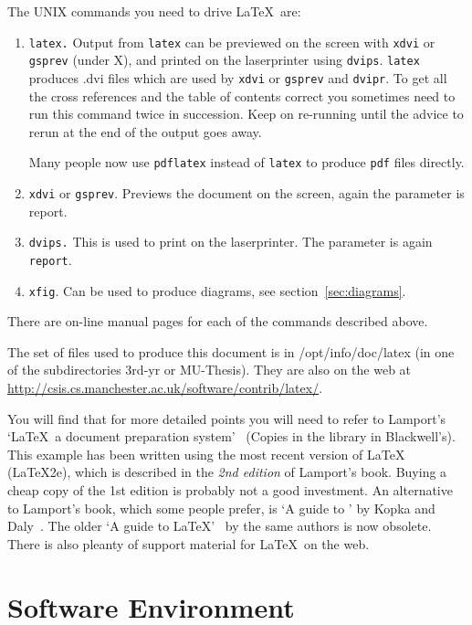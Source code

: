 The UNIX commands you need to drive \LaTeX\ are:
\begin{enumerate}
\item \texttt{latex.} Output from \texttt{latex} can be previewed on
  the screen with \texttt{xdvi} or \texttt{gsprev} (under X), and printed on the laserprinter using  \texttt{dvips}.
  \texttt{latex} produces \textsf{.dvi} files which are used by
  \texttt{xdvi} or \texttt{gsprev} and \texttt{dvipr}.  To get all the
  cross references and the table of contents correct you sometimes
  need to run this command twice in succession.  Keep on re-running
  until the advice to rerun at the end of the output goes away.

  Many people now use \texttt{pdflatex} instead of \texttt{latex} to produce \texttt{pdf} files directly.
  
\item \texttt{xdvi} or \texttt{gsprev}. Previews the document on the
  screen, again the parameter is \textsf{report}.
  
\item \texttt{dvips.} This is used to print on the laserprinter.  The
  parameter is again \texttt{report}. 
  
\item \texttt{xfig}. Can be used to produce diagrams, see
  section~\ref{sec:diagrams}.

\end{enumerate}
There are on-line manual pages for each of the commands described above.

The set of files used to produce this document is in
\textsf{/opt/info/doc/latex} (in one of the subdirectories
\textsf{3rd-yr} or \textsf{MU-Thesis}).  They are also on the web at \url{http://csis.cs.manchester.ac.uk/software/contrib/latex/}. 

You will find that for more detailed points you will need to refer to
Lamport's `\LaTeX\ a document preparation system'~\cite{lamport}
(Copies in the library  in Blackwell's).
This example has been written using the most recent version of \LaTeX
(LaTeX2e), which is described in the \emph{2nd edition} of Lamport's
book. Buying a cheap copy of the 1st edition is probably not a good
investment. An alternative to Lamport's book, which some people
prefer, is `A guide to {\LaTeXe}' by Kopka and Daly~\cite{kopka}. The
older `A guide to {\LaTeX}'~\cite{kopka-old} by the same authors is
now obsolete. There is also pleanty of support material for \LaTeX\ on the web.

\section{Software Environment}
